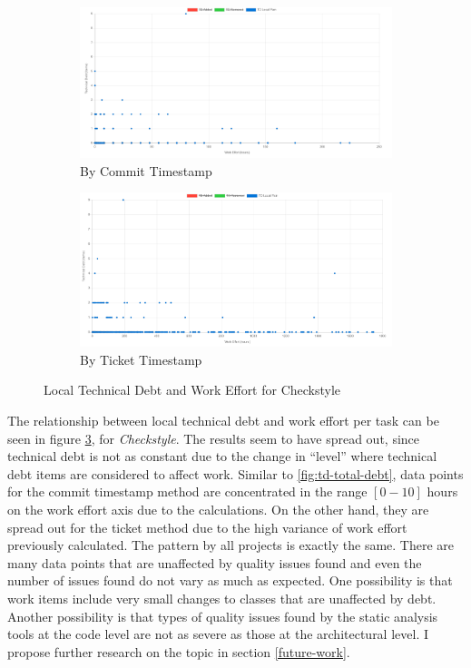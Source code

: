 \documentclass{mpaper}
\begin{document}
\begin{figure}
	\centering
	\begin{subfigure}{.45\textwidth}
		\includegraphics[width=\linewidth]{images/checkstyle_local_debt_commit.png}
		\caption{By Commit Timestamp}
		\label{fig:collections-td-timeline}
	\end{subfigure}
	\begin{subfigure}{.45\textwidth}
		\includegraphics[width=\linewidth]{images/checkstyle_local_debt_ticket.png}
		\caption{By Ticket Timestamp}
		\label{fig:spring-td-timeline}
	\end{subfigure}
	\caption{Local Technical Debt and Work Effort for Checkstyle}
	\label{fig:td-local-debt}
\end{figure}

The relationship between local technical debt and work effort per task can be
seen in figure \ref{fig:td-local-debt}, for \emph{Checkstyle}. The results seem
to have spread out, since technical debt is not as constant due to the change in
``level'' where technical debt items are considered to affect work. Similar to
\ref{fig:td-total-debt}, data points for the commit timestamp method are
concentrated in the range $[0-10]$ hours on the work effort axis due to the
calculations. On the other hand, they are spread out for the ticket method due
to the high variance of work effort previously calculated. The pattern by all
projects is exactly the same. There are many data points that are unaffected by
quality issues found and even the number of issues found do not vary as much as
expected. One possibility is that work items include very small changes to
classes that are unaffected by debt. Another possibility is that types of
quality issues found by the static analysis tools at the code level are not as
severe as those at the architectural level. I propose further research on the
topic in section \ref{future-work}. 
\end{document}
